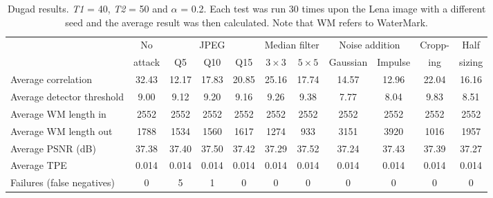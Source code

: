 \documentclass[10pt,twocolumn]{article}
\begin{document}
\begin{table*}[!t]
\begin{center}
\begin{scriptsize}
\begin{tabular}{|p{2.75cm}|c|c|c|c|c|c|c|c|c|c|} \hline
& No &\multicolumn{3}{|c|}{JPEG} & \multicolumn{2}{|c|}{Median filter} 
	& \multicolumn{2}{|c|}{Noise addition} & Cropp- & Half \\ \cline{3-9} %
& attack & Q5 & Q10 & Q15 & $3 \times 3$ & $5 \times 5$ 
	& Gaussian & Impulse & ing & sizing \\ \hline   %
Average correlation & 32.43 & 12.17 & 17.83 & 20.85 & 25.16 & 17.74 & 14.57 & 12.96 & 22.04 & 16.16 \\ \hline %
Average detector threshold & 9.00 & 9.12 & 9.20 & 9.16 & 9.26 & 9.38 & 7.77 & 8.04 & 9.83 & 8.51 \\ \hline %
Average WM length in & 2552 & 2552 & 2552 & 2552 & 2552 & 2552 & 2552 & 2552 & 2552 & 2552 \\ \hline %
Average WM length out & 1788 & 1534 & 1560 & 1617 & 1274 & 933 & 3151 & 3920 & 1016 & 1957 \\ \hline %
Average PSNR (dB) & 37.38 & 37.40 & 37.50 & 37.42 & 37.29 & 37.52 & 37.24 & 37.43 & 37.39 & 37.27 \\ \hline %
Average TPE & 0.014 & 0.014& 0.014& 0.014& 0.014& 0.014& 0.014& 0.014& 0.014& 0.014\\ \hline %
Failures (false negatives)& 0 & 5 & 1 & 0 & 0 & 0 & 0 & 0 & 0 & 0 \\ \hline %
\end{tabular}
\end{scriptsize}
\end{center}
\caption{Dugad results. \emph{T1} = 40, \emph{T2} = 50 and $\alpha$ = 0.2. Each test was run
	30 times upon the Lena image with a different seed and the average result was then calculated.
	Note that WM refers to WaterMark.}
\label{dugResults}
\end{table*}
\end{document}
